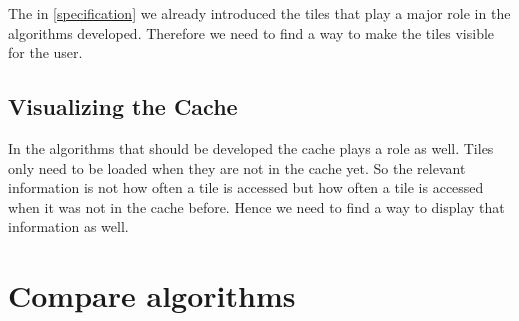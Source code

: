 \documentclass
[
	paper = a4,
    pagesize,
	12 pt,
	oneside,                       %
    open = right,
	DIV = calc,
	BCOR = 0 mm,                   %
	bibtotoc
]
{scrbook}
\begin{document}
The in \ref{specification} we already introduced the tiles that play a major role in the algorithms developed.
Therefore we need to find a way to make the tiles visible for the user.


\subsection{Visualizing the Cache}


In the algorithms that should be developed the cache plays a role as well.
Tiles only need to be loaded when they are not in the cache yet.
So the relevant information is not how often a tile is accessed but how often a tile is accessed when it was not in the cache before.
Hence we need to find a way to display that information as well.


\section{Compare algorithms}

\end{document}
